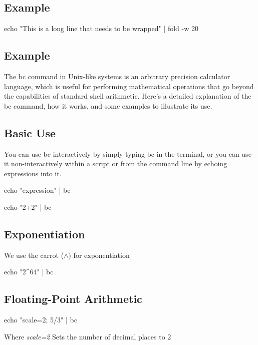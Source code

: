 \documentclass{report}
\begin{document}
    \subsection{Example}
    \bigbreak \noindent 
    \begin{bashcode}
        echo "This is a long line that needs to be wrapped" | fold -w 20
    \end{bashcode}

    \bigbreak \noindent 
    \subsection{Example}
    \bigbreak \noindent 
    \pagebreak 
    \bigbreak \noindent 
    The bc command in Unix-like systems is an arbitrary precision calculator language, which is useful for performing mathematical operations that go beyond the capabilities of standard shell arithmetic. Here's a detailed explanation of the bc command, how it works, and some examples to illustrate its use.
    \bigbreak \noindent 
    \subsection{Basic Use}
    \bigbreak \noindent 
    You can use bc interactively by simply typing bc in the terminal, or you can use it non-interactively within a script or from the command line by echoing expressions into it.
    \bigbreak \noindent 
    \begin{bashcode}
        echo "expression" | bc

        echo "2+2" | bc
    \end{bashcode}
    \bigbreak \noindent 
    \subsection{Exponentiation}
    \bigbreak \noindent 
    We use the carrot ($\land$) for exponentiation
    \bigbreak \noindent 
    \begin{bashcode}
        echo "2^64" | bc
    \end{bashcode}

    \bigbreak \noindent 
    \subsection{Floating-Point Arithmetic}
    \bigbreak \noindent 
    \begin{bashcode}
        echo "scale=2; 5/3" | bc
    \end{bashcode}
    \bigbreak \noindent 
    Where \textit{scale=2} Sets the number of decimal places to 2
\end{document}
